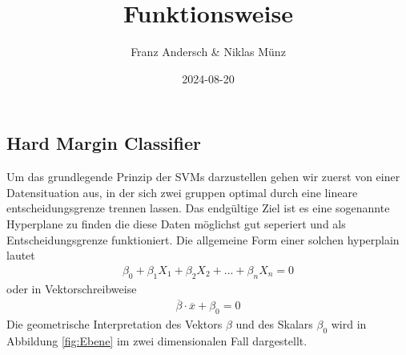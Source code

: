 \documentclass[
]{article}
\title{Funktionsweise}
\author{Franz Andersch \& Niklas Münz}
\date{2024-08-20}
\renewcommand{\maketitle}{}
\begin{document}
\maketitle

\subsection{Hard Margin Classifier}

Um das grundlegende Prinzip der SVMs darzustellen gehen wir zuerst von
einer Datensituation aus, in der sich zwei gruppen optimal durch eine
lineare entscheidungsgrenze trennen lassen. Das endgültige Ziel ist es
eine sogenannte Hyperplane zu finden die diese Daten möglichst gut
seperiert und als Entscheidungsgrenze funktioniert. Die allgemeine Form
einer solchen hyperplain lautet \begin{align}
\beta_0+ \beta_1 X_1+\beta_2 X_2+...+\beta_n X_n=0\label{eq:hyperebene}
\end{align} oder in Vektorschreibweise \begin{align}
\overline{\beta}\cdot\overline{x}+\beta_0=0 \label{eq:hyperplanevec}
\end{align} Die geometrische Interpretation des Vektors \(\beta\) und
des Skalars \(\beta_0\) wird in Abbildung \ref{fig:Ebene} im zwei
dimensionalen Fall dargestellt.
\end{document}
